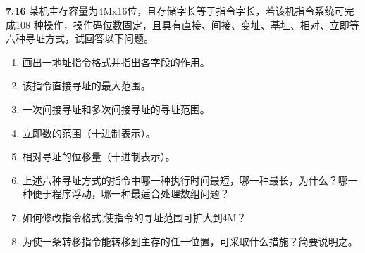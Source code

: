 \documentclass[UTF8]{report}
\newcommand{\problem}[1]{{\setlength{\parskip}{10pt}\noindent \bf{#1}}}
\begin{document}
\problem{7.16} 某机主存容量为4Mx16位，且存储字长等于指令字长，若该机指令系统可完成108 种操作，操作码位数固定，且具有直接、间接、变址、基址、相对、立即等六种寻址方式，试回答以下问题。
\begin{enumerate}
    \item 画出一地址指令格式并指出各字段的作用。
    \item 该指令直接寻址的最大范围。
    \item 一次间接寻址和多次间接寻址的寻址范围。
    \item 立即数的范围（十进制表示）。
    \item 相对寻址的位移量（十进制表示）。
    \item 上述六种寻址方式的指令中哪一种执行时间最短，哪一种最长，为什么？哪一种便于程序浮动，哪一种最适合处理数组问题？
    \item 如何修改指令格式,使指令的寻址范围可扩大到4M？
    \item 为使一条转移指令能转移到主存的任一位置，可采取什么措施？简要说明之。
\end{enumerate}
\end{document}
